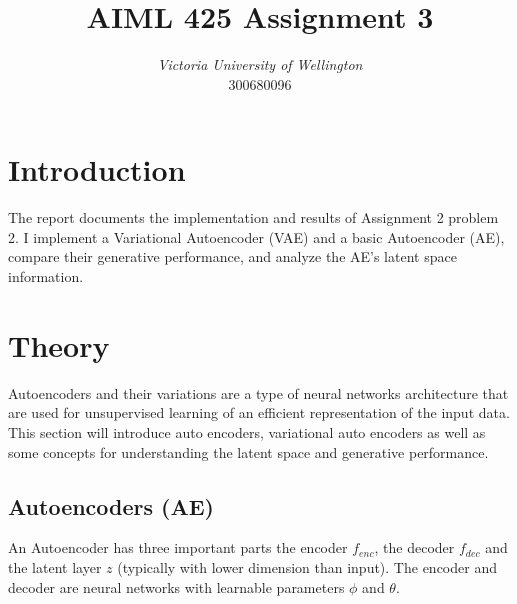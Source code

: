\documentclass[conference,a4paper]{IEEEtran}
\begin{document}
\title{AIML 425 Assignment 3 %
}

\author{
\textit{Victoria University of Wellington}\\
300680096}


\maketitle

\section{Introduction}
The report documents the implementation and results of Assignment 2 problem 2. I implement a Variational Autoencoder (VAE) and a basic Autoencoder (AE), compare their generative performance, and analyze the AE’s latent space information.

\section{Theory}

Autoencoders and their variations are a type of neural networks architecture that are used for unsupervised learning of an efficient representation of the input data. This section will introduce auto encoders, variational auto encoders as well as some concepts for understanding the latent space and generative performance.

\subsection{Autoencoders (AE)}

An Autoencoder \cite{hintonReducingDimensionalityData2006} has three important parts the encoder $f_{enc}$, the decoder $f_{dec}$ and the latent layer $z$ (typically with lower dimension than input). The encoder and decoder are neural networks with learnable parameters $\phi$ and $\theta$.
\end{document}
